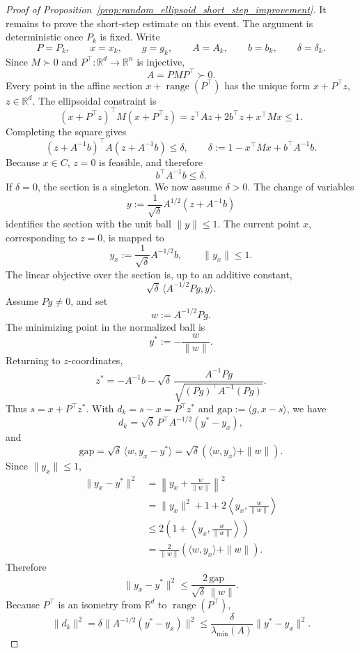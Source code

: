 \documentclass{article}
\begin{document}
\begin{proof}[Proof of Proposition~\ref{prop:random_ellipsoid_short_step_improvement}]
It remains to prove the short-step estimate on this event. The argument is
deterministic once \(P_k\) is fixed. Write
\[
P=P_k,\qquad x=x_k,\qquad g=g_k,\qquad A=A_k,\qquad b=b_k,\qquad
\delta=\delta_k.
\]
Since \(M\succ0\) and \(P^\top:\mathbb R^d\to\mathbb R^n\) is injective,
\[
A=PMP^\top\succ0.
\]
Every point in the affine section \(x+\operatorname{range}(P^\top)\) has the
unique form \(x+P^\top z\), \(z\in\mathbb R^d\). The ellipsoidal constraint is
\[
(x+P^\top z)^\top M(x+P^\top z)
=
z^\top A z+2b^\top z+x^\top Mx
\le1.
\]
Completing the square gives
\begin{equation}
(z+A^{-1}b)^\top A(z+A^{-1}b)
\le
\delta,
\qquad
\delta:=1-x^\top Mx+b^\top A^{-1}b.
\label{eq:ellipsoid_completed_square_corrected}
\end{equation}
Because \(x\in C\), \(z=0\) is feasible, and therefore
\[
b^\top A^{-1}b\le \delta.
\]
If \(\delta=0\), the section is a singleton. We now assume \(\delta>0\). The
change of variables
\[
y:=\frac1{\sqrt\delta}A^{1/2}(z+A^{-1}b)
\]
identifies the section with the unit ball \(\|y\|\le1\). The current point
\(x\), corresponding to \(z=0\), is mapped to
\[
y_x:=\frac1{\sqrt\delta}A^{-1/2}b,
\qquad
\|y_x\|\le1.
\]
The linear objective over the section is, up to an additive constant,
\[
\sqrt\delta\,\langle A^{-1/2}Pg,y\rangle.
\]
Assume \(Pg\neq0\), and set
\[
w:=A^{-1/2}Pg.
\]
The minimizing point in the normalized ball is
\[
y^*:=-\frac{w}{\|w\|}.
\]
Returning to \(z\)-coordinates,
\[
z^*
=
-A^{-1}b
-
\sqrt\delta\,
\frac{A^{-1}Pg}{\sqrt{(Pg)^\top A^{-1}(Pg)}}.
\]
Thus \(s=x+P^\top z^*\). With \(d_k=s-x=P^\top z^*\) and
\(\mathrm{gap}:=\langle g,x-s\rangle\), we have
\[
d_k
=
\sqrt\delta\,P^\top A^{-1/2}(y^*-y_x),
\]
and
\[
\mathrm{gap}
=
\sqrt\delta\,\langle w,y_x-y^*\rangle
=
\sqrt\delta\left(\langle w,y_x\rangle+\|w\|\right).
\]
Since \(\|y_x\|\le1\),
\begin{align*}
\|y_x-y^*\|^2
&=
\left\|y_x+\frac{w}{\|w\|}\right\|^2 \\
&=
\|y_x\|^2+1+2\left\langle y_x,\frac{w}{\|w\|}\right\rangle \\
&\le
2\left(1+\left\langle y_x,\frac{w}{\|w\|}\right\rangle\right) \\
&=
\frac{2}{\|w\|}
\left(\langle w,y_x\rangle+\|w\|\right).
\end{align*}
Therefore
\[
\|y_x-y^*\|^2
\le
\frac{2\,\mathrm{gap}}{\sqrt\delta\,\|w\|}.
\]
Because \(P^\top\) is an isometry from \(\mathbb R^d\) to
\(\operatorname{range}(P^\top)\),
\[
\|d_k\|^2
=
\delta\|A^{-1/2}(y^*-y_x)\|^2
\le
\frac{\delta}{\lambda_{\min}(A)}\|y^*-y_x\|^2.
\]
\end{proof}
\end{document}
